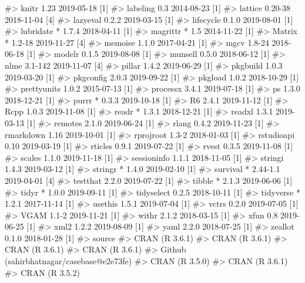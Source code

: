 \documentclass[
]{jss}
\begin{document}
\begin{CodeChunk}
\begin{CodeOutput}
#>  knitr         1.23       2019-05-18 [1]
#>  labeling      0.3        2014-08-23 [1]
#>  lattice       0.20-38    2018-11-04 [4]
#>  lazyeval      0.2.2      2019-03-15 [1]
#>  lifecycle     0.1.0      2019-08-01 [1]
#>  lubridate   * 1.7.4      2018-04-11 [1]
#>  magrittr    * 1.5        2014-11-22 [1]
#>  Matrix      * 1.2-18     2019-11-27 [4]
#>  memoise       1.1.0      2017-04-21 [1]
#>  mgcv          1.8-24     2018-06-18 [1]
#>  modelr        0.1.5      2019-08-08 [1]
#>  munsell       0.5.0      2018-06-12 [1]
#>  nlme          3.1-142    2019-11-07 [4]
#>  pillar        1.4.2      2019-06-29 [1]
#>  pkgbuild      1.0.3      2019-03-20 [1]
#>  pkgconfig     2.0.3      2019-09-22 [1]
#>  pkgload       1.0.2      2018-10-29 [1]
#>  prettyunits   1.0.2      2015-07-13 [1]
#>  processx      3.4.1      2019-07-18 [1]
#>  ps            1.3.0      2018-12-21 [1]
#>  purrr       * 0.3.3      2019-10-18 [1]
#>  R6            2.4.1      2019-11-12 [1]
#>  Rcpp          1.0.3      2019-11-08 [1]
#>  readr       * 1.3.1      2018-12-21 [1]
#>  readxl        1.3.1      2019-03-13 [1]
#>  remotes       2.1.0      2019-06-24 [1]
#>  rlang         0.4.2      2019-11-23 [1]
#>  rmarkdown     1.16       2019-10-01 [1]
#>  rprojroot     1.3-2      2018-01-03 [1]
#>  rstudioapi    0.10       2019-03-19 [1]
#>  rticles       0.9.1      2019-07-22 [1]
#>  rvest         0.3.5      2019-11-08 [1]
#>  scales        1.1.0      2019-11-18 [1]
#>  sessioninfo   1.1.1      2018-11-05 [1]
#>  stringi       1.4.3      2019-03-12 [1]
#>  stringr     * 1.4.0      2019-02-10 [1]
#>  survival    * 2.44-1.1   2019-04-01 [4]
#>  testthat      2.2.0      2019-07-22 [1]
#>  tibble      * 2.1.3      2019-06-06 [1]
#>  tidyr       * 1.0.0      2019-09-11 [1]
#>  tidyselect    0.2.5      2018-10-11 [1]
#>  tidyverse   * 1.2.1      2017-11-14 [1]
#>  usethis       1.5.1      2019-07-04 [1]
#>  vctrs         0.2.0      2019-07-05 [1]
#>  VGAM          1.1-2      2019-11-21 [1]
#>  withr         2.1.2      2018-03-15 [1]
#>  xfun          0.8        2019-06-25 [1]
#>  xml2          1.2.2      2019-08-09 [1]
#>  yaml          2.2.0      2018-07-25 [1]
#>  zeallot       0.1.0      2018-01-28 [1]
#>  source                                  
#>  CRAN (R 3.6.1)                          
#>  CRAN (R 3.6.1)                          
#>  CRAN (R 3.6.1)                          
#>  CRAN (R 3.6.1)                          
#>  Github (sahirbhatnagar/casebase@e2e73fe)
#>  CRAN (R 3.5.0)                          
#>  CRAN (R 3.6.1)                          
#>  CRAN (R 3.5.2)                          

\end{CodeOutput}
\end{CodeChunk}
\end{document}
